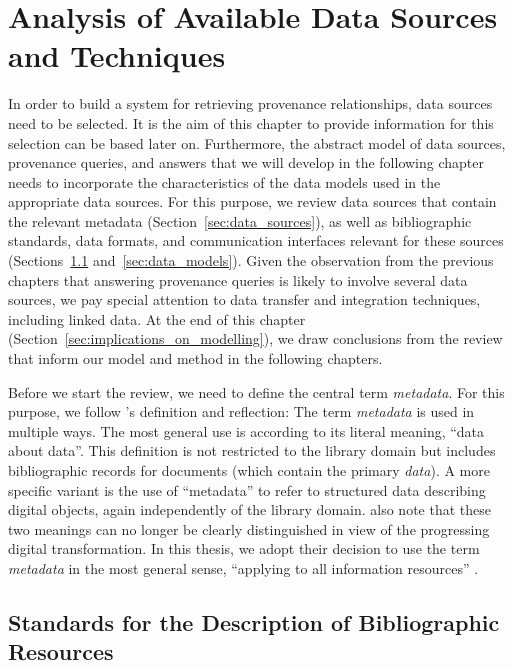 \chapter{Analysis of Available Data Sources and Techniques}
\label{chap:analysis}

In order to build a system for retrieving provenance relationships,
data sources need to be selected. It is the aim of this chapter
to provide information for this selection can be based later on.
Furthermore, the abstract model of data sources, provenance queries, and answers
that we will develop in the following chapter
needs to incorporate the characteristics of the data models used in the appropriate data sources.
For this purpose, we review data sources that contain the relevant metadata (Section~\ref{sec:data_sources}),
as well as bibliographic standards, data formats, and communication interfaces
relevant for these sources (Sections~\ref{sec:bib_standards} and~\ref{sec:data_models}).
Given the observation from the previous chapters
that answering provenance queries is likely to involve several data sources,
we pay special attention to data transfer and integration techniques,
including linked data.
At the end of this chapter (Section~\ref{sec:implications_on_modelling}),
we draw conclusions from the review that inform our model and method in the following chapters.

Before we start the review, we need to define the central term \emph{metadata}.
For this purpose, we follow \citeauthor{Hider2008}'s \autocite*{Hider2008} definition and reflection:
The term \emph{metadata} is used in multiple ways.
The most general use is according to its literal meaning, \enquote{data about data}.
This definition is not restricted to the library domain
but includes bibliographic records for documents (which contain the primary \emph{data}).
A more specific variant is the use of \enquote{metadata} to refer to
structured data describing digital objects,
again independently of the library domain. \citeauthor{Hider2008} also note that
these two meanings can no longer be clearly distinguished in view of the
progressing digital transformation. In this thesis, we adopt their
decision to use the term \emph{metadata} in the most general sense,
\enquote{applying to all information resources} \autocite[p.13]{Hider2008}.

\section{Standards for the Description of Bibliographic Resources}
\label{sec:bib_standards}


